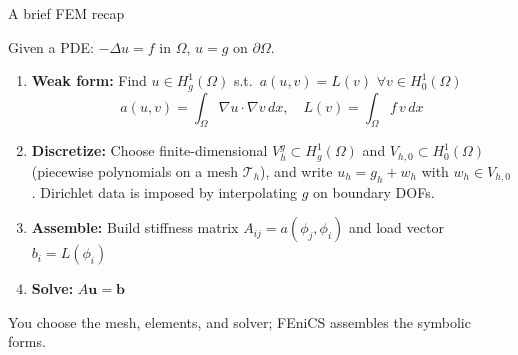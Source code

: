\documentclass[aspectratio=169, 11pt]{beamer}
\begin{document}
\begin{frame}{A brief FEM recap}

Given a PDE: $-\Delta u = f$ in $\Omega$, $u = g$ on $\partial\Omega$.

\bigskip

\begin{enumerate}
    \item \textbf{Weak form:}
        Find $u \in H_g^1(\Omega)$ s.t.\ $a(u,v) = L(v)$ $\forall v \in H_0^1(\Omega)$
    \[
      a(u,v) = \int_\Omega \nabla u \cdot \nabla v \, dx,
      \quad
      L(v) = \int_\Omega f \, v \, dx
    \]

          \item \textbf{Discretize:} Choose finite-dimensional
              $V_h^g \subset H_g^1(\Omega)$ and $V_{h,0} \subset H_0^1(\Omega)$
              (piecewise polynomials on a mesh $\mathcal{T}_h$), and write
              $u_h = g_h + w_h$ with $w_h \in V_{h,0}$.
              Dirichlet data is imposed by interpolating $g$ on boundary DOFs.

    \item \textbf{Assemble:} Build stiffness matrix $A_{ij} = a(\phi_j, \phi_i)$
          and load vector $b_i = L(\phi_i)$

    \item \textbf{Solve:} $A \mathbf{u} = \mathbf{b}$
\end{enumerate}

\bigskip
You choose the mesh, elements, and solver; FEniCS assembles the symbolic forms.
\end{frame}
\end{document}
